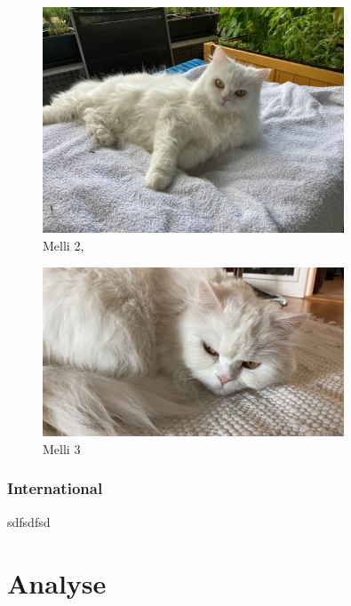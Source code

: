 \documentclass[12pt,ngerman,parskip=half]{scrartcl}
\begin{document}
\blindtext[10]


\begin{figure}
\begin{center}
\includegraphics[width=0.8\textwidth]{Bilder/Katze1}
\caption[Kurzversion der caption]{Melli 2, \blindtext}
\end{center}
\end{figure}

\blindtext[10]


\begin{figure}
\begin{center}
\includegraphics[width=0.8\textwidth]{Bilder/miau}
\caption{Melli 3}
\end{center}
\end{figure}

\subsubsection{International}

sdfsdfsd


\blindtext

\section{Analyse} 
\end{document}
